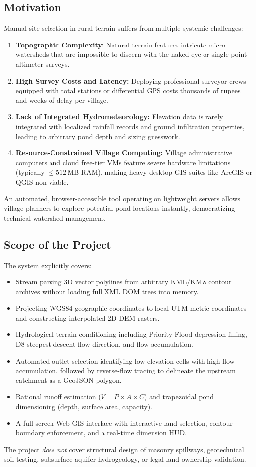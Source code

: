 \documentclass[manuscript,screen,review]{acmart}
\begin{document}
\subsection{Motivation}
Manual site selection in rural terrain suffers from multiple systemic challenges:
\begin{enumerate}
    \item \textbf{Topographic Complexity:} Natural terrain features intricate micro-watersheds that are impossible to discern with the naked eye or single-point altimeter surveys.
    \item \textbf{High Survey Costs and Latency:} Deploying professional surveyor crews equipped with total stations or differential GPS costs thousands of rupees and weeks of delay per village.
    \item \textbf{Lack of Integrated Hydrometeorology:} Elevation data is rarely integrated with localized rainfall records and ground infiltration properties, leading to arbitrary pond depth and sizing guesswork.
    \item \textbf{Resource-Constrained Village Computing:} Village administrative computers and cloud free-tier VMs feature severe hardware limitations (typically $\le 512$\,MB RAM), making heavy desktop GIS suites like ArcGIS or QGIS non-viable.
\end{enumerate}
An automated, browser-accessible tool operating on lightweight servers allows village planners to explore potential pond locations instantly, democratizing technical watershed management.

\subsection{Scope of the Project}
The system explicitly covers:
\begin{itemize}
    \item Stream parsing 3D vector polylines from arbitrary KML/KMZ contour archives without loading full XML DOM trees into memory.
    \item Projecting WGS84 geographic coordinates to local UTM metric coordinates and constructing interpolated 2D DEM rasters.
    \item Hydrological terrain conditioning including Priority-Flood depression filling, D8 steepest-descent flow direction, and flow accumulation.
    \item Automated outlet selection identifying low-elevation cells with high flow accumulation, followed by reverse-flow tracing to delineate the upstream catchment as a GeoJSON polygon.
    \item Rational runoff estimation ($V = P \times A \times C$) and trapezoidal pond dimensioning (depth, surface area, capacity).
    \item A full-screen Web GIS interface with interactive land selection, contour boundary enforcement, and a real-time dimension HUD.
\end{itemize}
The project \emph{does not} cover structural design of masonry spillways, geotechnical soil testing, subsurface aquifer hydrogeology, or legal land-ownership validation.
\end{document}
